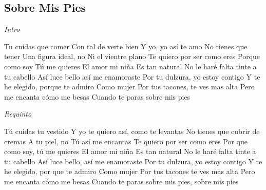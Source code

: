 \subsection{Sobre Mis Pies}
\noindent

\vspace{1cm}

\begin{guitar}
	\begin{multicols}{2}
		\textit{Intro}
		\par
		Tu cuidas que comer
		Con tal de verte bien
		Y yo, yo así te amo
		No tienes que tener
		Una figura ideal, no
		Ni el vientre plano
		Te quiero por ser como eres
		Porque como soy
		Tú me quieres
		El amor mi niña
		Es tan natural
		No le haré falta tinte a tu cabello
		Así luce bello así me enamoraste
		Por tu dulzura, yo estoy contigo
		Y te he elegido, porque te admiro
		Como mujer
		Por tus tacones, te ves mas alta
		Pero me encanta cómo me besas
		Cuando te paras sobre mis pies

		\par
		\textit{Requinto}
		\par

		Tú cuidas tu vestido
		Y yo te quiero así, como te levantas
		No tienes que cubrir de cremas
		A tu piel, no
		Tú así me encantas
		Te quiero por ser como eres
		Por que como soy, tú me quieres
		El amor mi niña
		Es tan natural
		No le haré falta tinte a tu cabello
		Así luce bello, así me enamoraste
		Por tu dulzura, yo estoy contigo
		Y te he elegido, por que te admiro
		Como mujer
		Por tus tacones te ves mas alta
		Pero me encanta cómo me besas
		Cuando te paras sobre mis pies, sobre mis pies

	\end{multicols}
\end{guitar}
